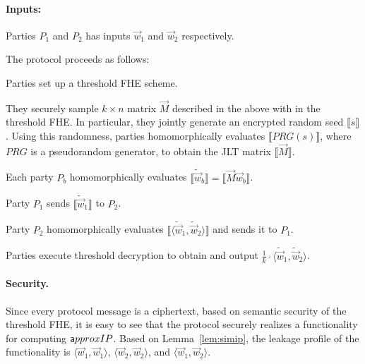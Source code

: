 \begin{algorithm}[htbp]



\paragraph{Inputs:} Parties $P_1$ and $P_2$ has inputs $\vec{w}_1$ and $\vec{w}_2$
respectively. 

\medskip

The protocol proceeds as follows:
\BEN
    \item Parties set up a threshold FHE scheme.  \item They securely
    sample $k \times n$ matrix $\vec M$ described in the above with in
    the threshold FHE. In particular, they jointly generate an encrypted
    random seed $\llbracket s \rrbracket$. Using this randomness, parties
    homomorphically evaluates $\llbracket PRG(s) \rrbracket$, where $PRG$ is a
    pseudorandom generator, to obtain the JLT matrix $\llbracket \vec M
    \rrbracket$.
    
    \item Each party  $P_b$ homomorphically evaluates $\llbracket \tilde{ \vec{w}}_b \rrbracket =
    \llbracket \vec M \vec{w}_b \rrbracket$.

    \item Party $P_1$ sends $\llbracket \tilde{\vec{w}}_1 \rrbracket$ to $P_2$.  
    
    \item Party $P_2$ homomorphically evaluates $\llbracket \langle \tilde
    {\vec{w}}_1, \tilde{\vec{w}}_2 \rangle \rrbracket$ and sends it to  $P_1$. 

    \item Parties execute threshold decryption to obtain and output
    $\frac 1 k \cdot \langle \tilde{\vec{w}}_1, \tilde {\vec{w}}_2 \rangle$.
\EEN
\caption{Private protocol for computing approximate inner product}
\label{fig:ip-fhe}
\end{algorithm}


\paragraph{Security.}
Since every protocol message is a ciphertext, based on semantic security
of the threshold FHE, it is easy to see that the protocol securely
realizes a functionality for computing ${\sf approxIP}$. 
%
Based on Lemma~\ref{lem:simip}, the leakage profile of the functionality is
$\langle \vec{w}_1, \vec{w}_1 \rangle$, $\langle
\vec{w}_2, \vec{w}_2 \rangle$, and $\langle \vec{w}_1, \vec{w}_2 \rangle$.




